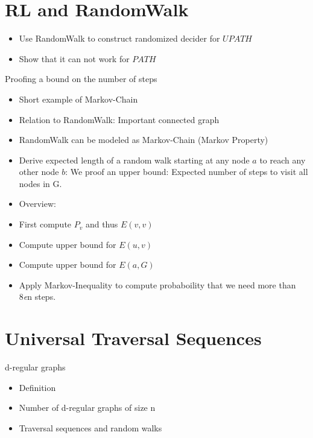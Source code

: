 \section{RL and RandomWalk}\label{rl-and-randomwalk}

\begin{itemize}
\item
  Use RandomWalk to construct randomized decider for $UPATH$
\item
  Show that it can not work for $PATH$
\end{itemize}

\begin{frame}{Proofing a bound on the number of steps}

\begin{itemize}
\item
  Short example of Markov-Chain
\item
  Relation to RandomWalk: Important connected graph
\item
  RandomWalk can be modeled as Markov-Chain (Markov Property)
\item
  Derive expected length of a random walk starting at any node $a$ to
  reach any other node $b$: We proof an upper bound: Expected number of
  steps to visit all nodes in G.
\item
  Overview:
\item
  First compute $P_v$ and thus $E(v, v)$
\item
  Compute upper bound for $E(u, v)$
\item
  Compute upper bound for $E(a, G)$
\item
  Apply Markov-Inequality to compute probaboility that we need more than
  8\emph{e}n steps.
\end{itemize}

\end{frame}

\section{Universal Traversal
Sequences}\label{universal-traversal-sequences}

\begin{frame}{d-regular graphs}

\begin{itemize}
\itemsep1pt\parskip0pt
\item
  Definition
\item
  Number of d-regular graphs of size n
\item
  Traversal sequences and random walks
\end{itemize}

\end{frame}

